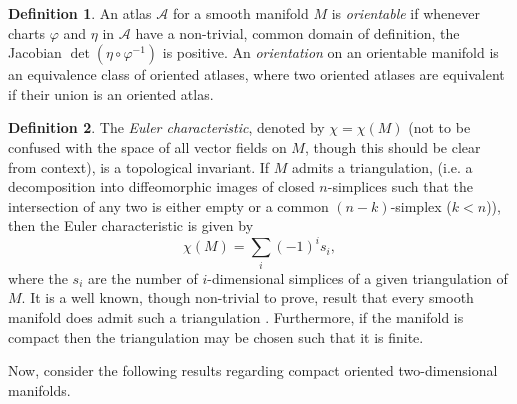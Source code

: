 \documentclass[12pt,a4paper]{article}
\numberwithin{equation}{section}
\theoremstyle{definition}
\newtheorem{definition}{Definition}[section]
\theoremstyle{remark}
\begin{document}
\begin{definition}
An atlas $\mathcal{A}$ for a smooth manifold $M$ is \textit{orientable} if whenever charts $\varphi$ and $\eta$ in $\mathcal{A}$ have a non-trivial, common domain of definition, the Jacobian $\det(\eta\circ\varphi^{-1})$ is positive. An \textit{orientation} on an orientable manifold is an equivalence class of oriented atlases, where two oriented atlases are equivalent if their union is an oriented atlas.
\end{definition}
\begin{definition}
The \textit{Euler characteristic}, denoted by $\chi=\chi(M)$ (not to be confused with the space of all vector fields on $M$, though this should be clear from context), is a topological invariant. If $M$ admits a triangulation, (i.e. a decomposition into diffeomorphic images of closed $n$-simplices such that the intersection of any two is either empty or a common $(n-k)$-simplex ($k<n$)), then the Euler characteristic is given by
\[
\chi(M)=\sum_i(-1)^is_i,
\] 
where the $s_i$ are the number of $i$-dimensional simplices of a given triangulation of $M$.
It is a well known, though non-trivial to prove, result that every smooth manifold does admit such a triangulation \cite{whitehead1940c1}. Furthermore, if the manifold is compact then the triangulation may be chosen such that it is finite.
\end{definition}

Now, consider the following results regarding compact oriented two-dimensional manifolds.
\end{document}
